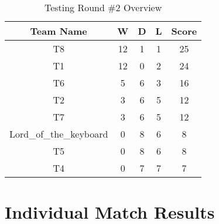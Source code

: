 \documentclass[a4paper,12pt]{article}
\begin{document}
\begin{table}[H]
  \centering
  \caption{Testing Round \#2 Overview}
  \begin{tabular}{|c|c|c|c|c|}
    \hline
      \textbf{Team Name} & \textbf{W} & \textbf{D} & \textbf{L} & \textbf{Score} \\
      \hline
      \hline
       
        
            T8 & 12 & 1 & 1 & 25 \\
            \hline  
            
               
        
            T1 & 12 & 0 & 2 & 24 \\
            \hline  
            
               
        
            T6 & 5 & 6 & 3 & 16 \\
            \hline  
            
               
        
            T2 & 3 & 6 & 5 & 12 \\
            \hline  
            
               
        
            T7 & 3 & 6 & 5 & 12 \\
            \hline  
            
               
         
          Lord\_of\_the\_keyboard & 0 & 8 & 6 & 8 \\
          \hline  
          
               
        
            T5 & 0 & 8 & 6 & 8 \\
            \hline  
            
               
        
            T4 & 0 & 7 & 7 & 7 \\
            \hline  
            
              
                
              \end{tabular}
              \label{table:overview}
          \end{table}

          \section{Individual Match Results}
          \label{sec:all}
\end{document}

